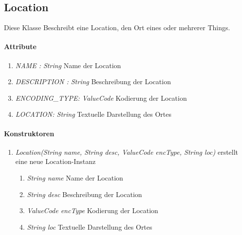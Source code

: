 \subsection*{Location}\label{loc}
Diese Klasse Beschreibt eine Location, den Ort eines oder mehrerer Things.

\paragraph{Attribute}
\begin{enumerate}[$\bullet$]
	\item \textit{NAME : String} Name der Location
	\item \textit{DESCRIPTION : String} Beschreibung der Location
	\item \textit{ENCODING\_TYPE: ValueCode} Kodierung der Location
	\item \textit{LOCATION: String} Textuelle Darstellung des Ortes
\end{enumerate}

\paragraph{Konstruktoren}
\begin{enumerate}[+]
	\item \textit{ Location(String name, String desc, ValueCode encType, String loc)}
	erstellt eine neue Location-Instanz
	\begin{enumerate}[$\bullet$]
		\item \textit{String name} Name der Location
		\item \textit{String desc} Beschreibung der Location
		\item \textit{ValueCode encType} Kodierung der Location
		\item \textit{String loc} Textuelle Darstellung des Ortes
	\end{enumerate}
	
\end{enumerate}
